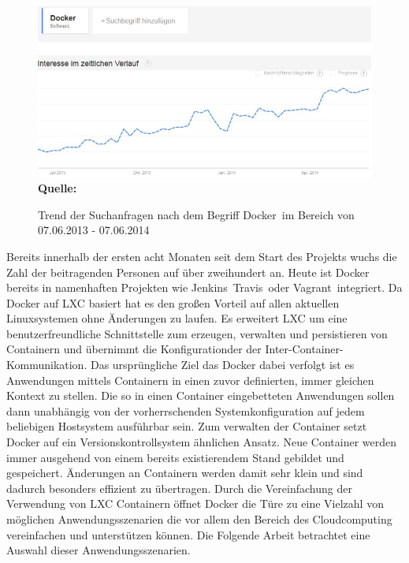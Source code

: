 \begin{figure}[htb]
  \centering  
  \includegraphics[scale=0.7]{img/docker_trend.JPG}\\
  \footnotesize\sffamily\textbf{Quelle:} \cite{google_trends_google_2014}
  \caption{Trend der Suchanfragen nach dem Begriff \grq Docker\grq\ im Bereich von 07.06.2013 - 07.06.2014 }
  \label{fig:iaas_paas_saas}
\end{figure}

Bereits innerhalb der ersten acht Monaten seit dem Start des Projekts wuchs die Zahl der beitragenden Personen auf über zweihundert an. 
Heute ist Docker bereits in namenhaften Projekten wie \grq Jenkins\grq\, \grq Travis\grq\ oder \grq Vagrant\grq\ integriert. \cite{hykes_docker_2013}
Da Docker auf LXC basiert hat es den großen Vorteil auf allen aktuellen Linuxsystemen ohne Änderungen zu laufen. Es erweitert LXC um eine benutzerfreundliche Schnittstelle zum erzeugen, verwalten und persistieren von Containern und übernimmt die Konfigurationder der Inter-Container-
Kommunikation. Das ursprüngliche Ziel das Docker dabei verfolgt ist es Anwendungen mittels Containern in einen zuvor definierten, immer gleichen Kontext zu stellen. Die so in einen Container eingebetteten Anwendungen sollen dann unabhängig von der vorherrschenden Systemkonfiguration auf jedem beliebigen Hostsystem ausführbar sein.
Zum verwalten der Container setzt Docker auf ein Versionskontrollsystem ähnlichen Ansatz.
Neue Container werden immer ausgehend von einem bereits existierendem Stand gebildet und gespeichert. Änderungen an Containern werden damit sehr klein und sind dadurch besonders effizient zu übertragen.
Durch die Vereinfachung der Verwendung von LXC Containern öffnet Docker die Türe zu eine Vielzahl von möglichen Anwendungsszenarien die vor allem den Bereich des Cloudcomputing vereinfachen und unterstützen können.
Die Folgende Arbeit betrachtet eine Auswahl dieser Anwendungsszenarien.